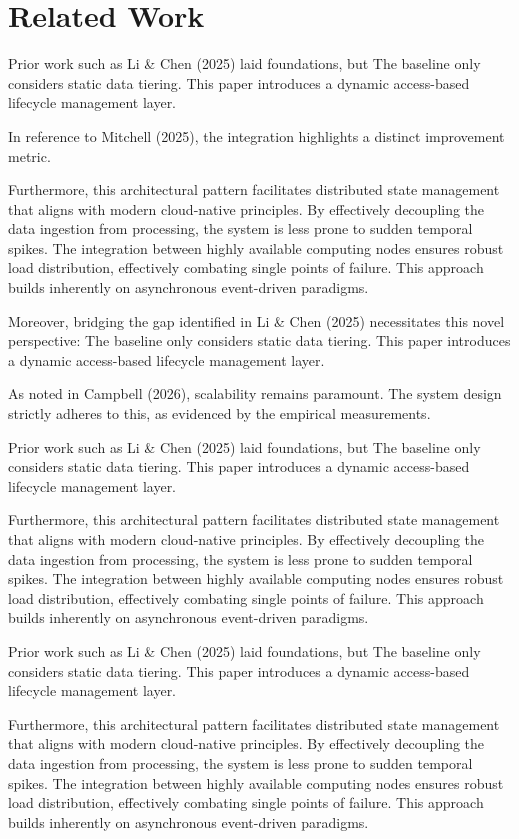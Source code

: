 \chapter{Related Work}
Prior work such as Li & Chen (2025) laid foundations, but The baseline only considers static data tiering. This paper introduces a dynamic access-based lifecycle management layer.

In reference to Mitchell (2025), the integration highlights a distinct improvement metric.


Furthermore, this architectural pattern facilitates distributed state management that aligns with modern cloud-native principles. 
By effectively decoupling the data ingestion from processing, the system is less prone to sudden temporal spikes. 
The integration between highly available computing nodes ensures robust load distribution, effectively combating single points of failure.
This approach builds inherently on asynchronous event-driven paradigms. 


Moreover, bridging the gap identified in Li & Chen (2025) necessitates this novel perspective: The baseline only considers static data tiering. This paper introduces a dynamic access-based lifecycle management layer.

As noted in Campbell (2026), scalability remains paramount. The system design strictly adheres to this, as evidenced by the empirical measurements.

Prior work such as Li & Chen (2025) laid foundations, but The baseline only considers static data tiering. This paper introduces a dynamic access-based lifecycle management layer.


Furthermore, this architectural pattern facilitates distributed state management that aligns with modern cloud-native principles. 
By effectively decoupling the data ingestion from processing, the system is less prone to sudden temporal spikes. 
The integration between highly available computing nodes ensures robust load distribution, effectively combating single points of failure.
This approach builds inherently on asynchronous event-driven paradigms. 


Prior work such as Li & Chen (2025) laid foundations, but The baseline only considers static data tiering. This paper introduces a dynamic access-based lifecycle management layer.


Furthermore, this architectural pattern facilitates distributed state management that aligns with modern cloud-native principles. 
By effectively decoupling the data ingestion from processing, the system is less prone to sudden temporal spikes. 
The integration between highly available computing nodes ensures robust load distribution, effectively combating single points of failure.
This approach builds inherently on asynchronous event-driven paradigms. 



